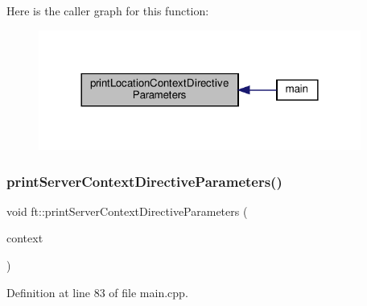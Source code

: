 Here is the caller graph for this function\+:
\nopagebreak
\begin{figure}[H]
\begin{center}
\leavevmode
\includegraphics[width=300pt]{namespaceft_a0036b0ebdedb1a1a1956f4ac3fafdbc4_icgraph}
\end{center}
\end{figure}
\mbox{\label{namespaceft_aba285440a3c3f0158982e0376d6a24f6}} 
\subsubsection{\texorpdfstring{print\+Server\+Context\+Directive\+Parameters()}{printServerContextDirectiveParameters()}}
{\footnotesize\ttfamily void ft\+::print\+Server\+Context\+Directive\+Parameters (\begin{DoxyParamCaption}\item[{\hyperlink{classft_1_1_server_block}{ft\+::\+Server\+Block} \&}]{context }\end{DoxyParamCaption})}



Definition at line 83 of file main.\+cpp.


